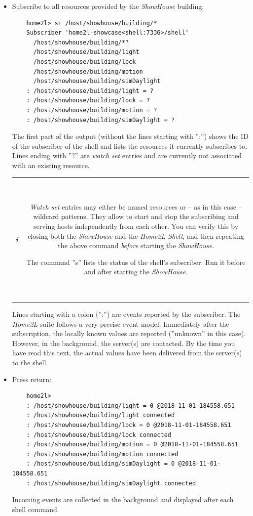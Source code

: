 \documentclass[12pt,english,parskip=half]{scrreprt}
\newcommand{\infobox}[1]{
  \hfill
  \setlength\arrayrulewidth{1pt}
  \begin{tabular}[t]{c|c|}
    \parbox{1.8em}{\hfill\textit{\Huge\textbf{i}\,}}
    &
    \,\parbox{0.89\linewidth}{\setlength{\parskip}{0.5em}#1}\,
  \end{tabular}
  \par
}
\begin{document}
\begin{itemize}[$\blacktriangleright$]
\item
  Subscribe to all resources provided by the \emph{ShowHouse} building:
  \begin{lstlisting}
    home2l> s+ /host/showhouse/building/*
    Subscriber 'home2l-showcase<shell:7336>/shell'
      /host/showhouse/building/*?
      /host/showhouse/building/light
      /host/showhouse/building/lock
      /host/showhouse/building/motion
      /host/showhouse/building/simDaylight
    : /host/showhouse/building/light = ?
    : /host/showhouse/building/lock = ?
    : /host/showhouse/building/motion = ?
    : /host/showhouse/building/simDaylight = ?
  \end{lstlisting}
  The first part of the output (without the lines starting with '':'')
  shows the ID of the subscriber of the shell and lists the resources it
  currently subscribes to. Lines ending with ''?'' are \emph{watch set}
  entries and are currently not associated with an existing resource.

  \infobox{
    \emph{Watch set} entries may either be named resources or -- as in this case -- wildcard
    patterns. They allow to start and stop the subscribing and serving hosts independently
    from each other. You can verify this by closing both the \emph{ShowHouse} and the \emph{Home2L Shell},
    and then repeating the above command \emph{before} starting the \emph{ShowHouse}.

    The command ''s'' lists the status of the shell's subscriber. Run it before and after starting
    the \emph{ShowHouse}.
  }

  Lines starting with a colon ('':'') are events reported by the
  subscriber. The \emph{Home2L} suite follows a very precise event model.
  Immediately after the subscription, the locally known values are
  reported (''unknown'' in this case). However, in the background,
  the server(s) are contacted. By the time you have read this text,
  the actual values have been delivered from the server(s) to the shell.

\item
  Press return:
  \begin{lstlisting}
    home2l>
    : /host/showhouse/building/light = 0 @2018-11-01-184558.651
    : /host/showhouse/building/light connected
    : /host/showhouse/building/lock = 0 @2018-11-01-184558.651
    : /host/showhouse/building/lock connected
    : /host/showhouse/building/motion = 0 @2018-11-01-184558.651
    : /host/showhouse/building/motion connected
    : /host/showhouse/building/simDaylight = 0 @2018-11-01-184558.651
    : /host/showhouse/building/simDaylight connected
  \end{lstlisting}
  Incoming events are collected in the background and displayed after each shell command.


\end{itemize}
\end{document}

